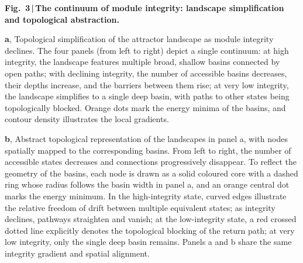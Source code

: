 
\noindent\textbf{Fig.~3\,|\,The continuum of module integrity: landscape
simplification and topological abstraction.}

\smallskip
\noindent\textbf{a}, Topological simplification of the attractor
landscape as module integrity declines. The four panels (from left to
right) depict a single continuum: at high integrity, the landscape
features multiple broad, shallow basins connected by open paths; with
declining integrity, the number of accessible basins decreases, their
depths increase, and the barriers between them rise; at very low
integrity, the landscape simplifies to a single deep basin, with paths
to other states being topologically blocked. Orange dots mark the
energy minima of the basins, and contour density illustrates the local
gradients.

\smallskip
\noindent\textbf{b}, Abstract topological representation of the
landscapes in panel a, with nodes spatially mapped to the corresponding
basins. From left to right, the number of accessible states decreases
and connections progressively disappear. To reflect the geometry of the
basins, each node is drawn as a solid coloured core with a dashed ring
whose radius follows the basin width in panel a, and an orange central
dot marks the energy minimum. In the high-integrity state, curved edges
illustrate the relative freedom of drift between multiple equivalent
states; as integrity declines, pathways straighten and vanish; at the
low-integrity state, a red crossed dotted line explicitly denotes the
topological blocking of the return path; at very low integrity, only
the single deep basin remains. Panels a and b share the same integrity
gradient and spatial alignment.